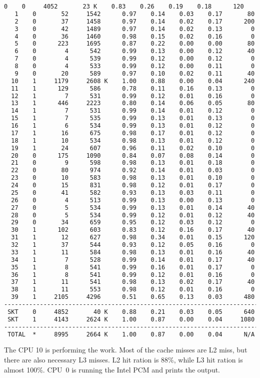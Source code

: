 \begin{lstlisting}[language=TeX]
   0    0     4052       23 K    0.83    0.26    0.19    0.18      120
   1    0       52     1542      0.97    0.14    0.03    0.17       80
   2    0       37     1458      0.97    0.14    0.02    0.17      200
   3    0       42     1489      0.97    0.14    0.02    0.13        0
   4    0       36     1460      0.98    0.15    0.02    0.16        0
   5    0      223     1695      0.87    0.22    0.00    0.00       80
   6    0        4      542      0.99    0.13    0.00    0.12       40
   7    0        4      539      0.99    0.12    0.00    0.12        0
   8    0        4      533      0.99    0.12    0.00    0.11        0
   9    0       20      589      0.97    0.10    0.02    0.11       40
  10    1     1179     2608 K    1.00    0.88    0.00    0.04      240
  11    1      129      586      0.78    0.11    0.16    0.13        0
  12    1        7      531      0.99    0.12    0.01    0.16        0
  13    1      446     2223      0.80    0.14    0.06    0.05       80
  14    1        7      531      0.99    0.14    0.01    0.12        0
  15    1        7      535      0.99    0.13    0.01    0.13        0
  16    1        6      534      0.99    0.13    0.01    0.12        0
  17    1       16      675      0.98    0.17    0.01    0.12        0
  18    1       10      534      0.98    0.13    0.01    0.12        0
  19    1       24      607      0.96    0.11    0.02    0.10        0
  20    0      175     1090      0.84    0.07    0.08    0.14        0
  21    0        9      598      0.98    0.13    0.01    0.18        0
  22    0       80      974      0.92    0.14    0.01    0.03        0
  23    0       10      583      0.98    0.13    0.01    0.10        0
  24    0       15      831      0.98    0.12    0.01    0.17        0
  25    0       41      582      0.93    0.13    0.03    0.11        0
  26    0        4      513      0.99    0.13    0.00    0.13        0
  27    0        5      534      0.99    0.13    0.01    0.14       40
  28    0        5      534      0.99    0.12    0.01    0.12       40
  29    0       34      659      0.95    0.12    0.03    0.12        0
  30    1      102      603      0.83    0.12    0.16    0.17       40
  31    1       12      627      0.98    0.34    0.01    0.15      120
  32    1       37      544      0.93    0.12    0.05    0.16        0
  33    1       11      584      0.98    0.13    0.01    0.16       40
  34    1        7      528      0.99    0.14    0.01    0.17       40
  35    1        8      541      0.99    0.16    0.01    0.17        0
  36    1        8      541      0.99    0.12    0.01    0.16        0
  37    1       11      541      0.98    0.13    0.02    0.17       40
  38    1       11      553      0.98    0.12    0.01    0.16        0
  39    1     2105     4296      0.51    0.65    0.13    0.03      480
-------------------------------------------------------------------------
 SKT    0     4852       40 K    0.88    0.21    0.03    0.05      640
 SKT    1     4143     2624 K    1.00    0.87    0.00    0.04     1080
-------------------------------------------------------------------------
 TOTAL  *     8995     2664 K    1.00    0.87    0.00    0.04      N/A
\end{lstlisting}

The CPU 10 is performing the work.
Most of the cache misses are L2 miss, but there are also necessary L3 misses.
L2 hit ration is 88\%, while L3 hit ration is almost 100\%.
CPU~0 is running the Intel PCM and prints the output.
